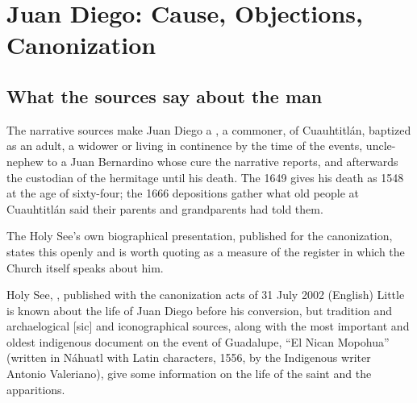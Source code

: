 \sectionguard
\section{Juan Diego: Cause, Objections, Canonization}

\subsection{What the sources say about the man}

The narrative sources make Juan Diego a , a
commoner, of Cuauhtitl\'an, baptized as an adult, a widower or living
in continence by the time of the events, uncle-nephew to a Juan
Bernardino whose cure the narrative reports, and afterwards the
custodian of the hermitage until his death. The 1649  gives his death as 1548 at the age of sixty-four; the
1666 depositions gather what old people at Cuauhtitl\'an said their
parents and grandparents had told them.

The Holy See's own biographical presentation, published for the
canonization, states this openly and is worth quoting as a measure of
the register in which the Church itself speaks about him.

\begin{operativetext}{Holy See, , published with the canonization acts of 31 July 2002
(English)}
Little is known about the life of Juan Diego before his conversion,
but tradition and archaelogical [sic] and iconographical sources,
along with the most important and oldest indigenous document on the
event of Guadalupe, ``El Nican Mopohua'' (written in N\'ahuatl with
Latin characters, 1556, by the Indigenous writer Antonio Valeriano),
give some information on the life of the saint and the
apparitions.
\end{operativetext}

